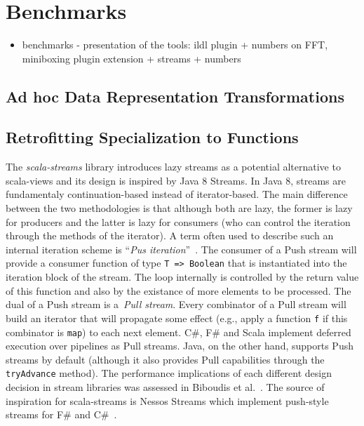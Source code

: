 \section{Benchmarks}
\label{sec:benchmarks}
\begin{itemize}
  \item benchmarks - presentation of the tools: ildl plugin + numbers on FFT, miniboxing plugin extension + streams + numbers
\end{itemize}

\subsection{Ad hoc Data Representation Transformations}
\label{sec:benchmarks:ad-hoc}

\subsection{Retrofitting Specialization to Functions}

\label{sec:benchmarks:funcs}
The \emph{scala-streams} library introduces lazy streams as a potential
alternative to scala-views and its design is inspired by Java 8 Streams. In Java
8, streams are fundamentaly continuation-based instead of iterator-based. The
main difference between the two methodologies is that although both are lazy,
the former is lazy for producers and the latter is lazy for consumers (who can
control the iteration through the methods of the iterator). A term often used to
describe such an internal iteration scheme is ``\emph{Pus
  iteration}''~\cite{obsidian,defuncpush}.  The consumer of a Push stream will
provide a consumer function of type \verb|T => Boolean| that is instantiated
into the iteration block of the stream. The loop internally is controlled by the
return value of this function and also by the existance of more elements to be
processed. The dual of a Push stream is a~\emph{Pull stream}. Every combinator
of a Pull stream will build an iterator that will propagate some effect (e.g.,
apply a function \verb|f| if this combinator is \verb|map|) to each next
element. C\#, F\# and Scala implement deferred execution over pipelines as Pull
streams. Java, on the other hand, supports Push streams by default (although it
also provides Pull capabilities through the \verb|tryAdvance| method). The
performance implications of each different design decision in stream libraries
was assessed in Biboudis et al.~\cite{biboudis_clash_2014}. The source of
inspiration for scala-streams is Nessos Streams which implement push-style
streams for F\# and C\#~\cite{nessos_streams}.

